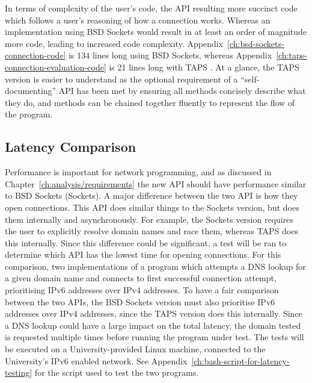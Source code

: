 In terms of complexity of the user's code, the API resulting more succinct code which follows a user's reasoning of how
a connection works.
Whereas an implementation using BSD Sockets would result in at least an order of magnitude more code, leading to
increased code complexity.
Appendix~\ref{ch:bsd-sockets-connection-code} is \(134\) lines long using BSD Sockets, whereas
Appendix~\ref{ch:taps-connection-evaluation-code} is 21 lines long with TAPS .
At a glance, the TAPS version is easier to understand as the optional requirement of a “self-documenting” API has been
met by ensuring all methods concisely describe what they do, and methods can be chained together fluently to represent
the flow of the program.

\subsection{Latency Comparison}\label{sec:latency-comparison}
Performance is important for network programming, and as discussed in Chapter~\ref{ch:analysis/requirements} the new
API should have performance similar to BSD Sockets (Sockets).
A major difference between the two API is how they open connections.
This API does similar things to the Sockets version, but does them internally and asynchronously.
For example, the Sockets version requires the user to explicitly resolve domain names and race them, whereas TAPS
does this internally.
Since this difference could be significant, a test will be ran to determine which API has the lowest time for opening
connections.
For this comparison, two implementations of a program which attempts a DNS lookup for a given domain name and connects
to first successful connection attempt, prioritising IPv6 addresses over IPv4 addresses.
To have a fair comparison between the two APIs, the BSD Sockets version must also prioritise IPv6 addresses over IPv4
addresses, since the TAPS version does this internally.
Since a DNS lookup could have a large impact on the total latency, the domain tested is requested multiple times before
running the program under test.
The tests will be executed on a University-provided Linux machine, connected to the University's IPv6 enabled network.
See Appendix~\ref{ch:bash-script-for-latency-testing} for the script used to test the two programs.

